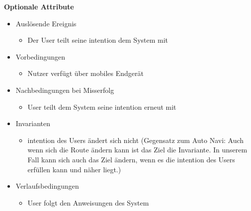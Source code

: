 \textbf{Optionale Attribute}
\begin{itemize}
\item Auslösende Ereignis
    \begin{itemize}
    \item Der User teilt seine \gls{intention} dem System mit
    \end{itemize}
\item Vorbedingungen
    \begin{itemize}
    \item Nutzer verfügt über mobiles Endgerät
    \end{itemize}
\item Nachbedingungen bei Misserfolg
    \begin{itemize}
    \item User teilt dem System seine \gls{intention} erneut mit
    \end{itemize}
\item Invarianten
    \begin{itemize}
    \item \gls{intention} des Users ändert sich nicht (Gegensatz zum Auto Navi: Auch wenn sich die Route ändern kann ist das Ziel die Invariante. In unserem Fall kann sich auch das Ziel ändern, wenn es die \gls{intention} des Users erfüllen kann und näher liegt.)
    \end{itemize}
\item Verlaufsbedingungen
    \begin{itemize}
    \item User folgt den Anweisungen des System
    \end{itemize}
\end{itemize}

